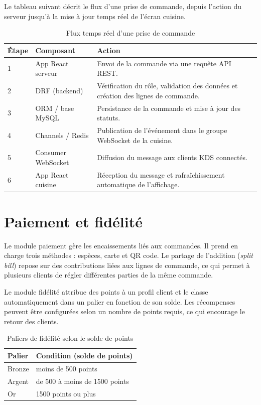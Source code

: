 Le tableau suivant décrit le flux d'une prise de commande, depuis l'action du serveur jusqu'à la mise à jour temps réel de l'écran cuisine.

\begin{table}[H]
\centering
\caption{Flux temps réel d'une prise de commande}
\begin{tabular}{p{1cm}p{4cm}p{8cm}}
\toprule
\textbf{Étape} & \textbf{Composant} & \textbf{Action} \\
\midrule
1 & App React serveur & Envoi de la commande via une requête API REST. \\
2 & DRF (backend) & Vérification du rôle, validation des données et création des lignes de commande. \\
3 & ORM / base MySQL & Persistance de la commande et mise à jour des statuts. \\
4 & Channels / Redis & Publication de l'événement dans le groupe WebSocket de la cuisine. \\
5 & Consumer WebSocket & Diffusion du message aux clients KDS connectés. \\
6 & App React cuisine & Réception du message et rafraîchissement automatique de l'affichage. \\
\bottomrule
\end{tabular}
\end{table}

\section{Paiement et fidélité}
Le module paiement gère les encaissements liés aux commandes. Il prend en charge trois méthodes : espèces, carte et QR code. Le partage de l'addition (\emph{split bill}) repose sur des contributions liées aux lignes de commande, ce qui permet à plusieurs clients de régler différentes parties de la même commande.

Le module fidélité attribue des points à un profil client et le classe automatiquement dans un palier en fonction de son solde. Les récompenses peuvent être configurées selon un nombre de points requis, ce qui encourage le retour des clients.

\begin{table}[H]
\centering
\caption{Paliers de fidélité selon le solde de points}
\begin{tabular}{p{4cm}p{6cm}}
\toprule
\textbf{Palier} & \textbf{Condition (solde de points)} \\
\midrule
Bronze & moins de 500 points \\
Argent & de 500 à moins de 1500 points \\
Or & 1500 points ou plus \\
\bottomrule
\end{tabular}
\end{table}

